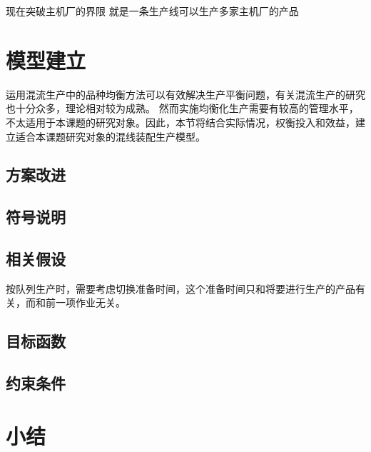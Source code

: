 现在突破主机厂的界限 就是一条生产线可以生产多家主机厂的产品


\section{模型建立}
运用混流生产中的品种均衡方法可以有效解决生产平衡问题，有关混流生产的研究也十分众多，理论相对较为成熟。
然而实施均衡化生产需要有较高的管理水平，不太适用于本课题的研究对象。因此，本节将结合实际情况，权衡投入和效益，建立适合本课题研究对象的混线装配生产模型。
\subsection{方案改进}


\subsection{符号说明}

\subsection{相关假设}
按队列生产时，需要考虑切换准备时间，这个准备时间只和将要进行生产的产品有关，而和前一项作业无关。

\subsection{目标函数}

\subsection{约束条件}


\section{小结}